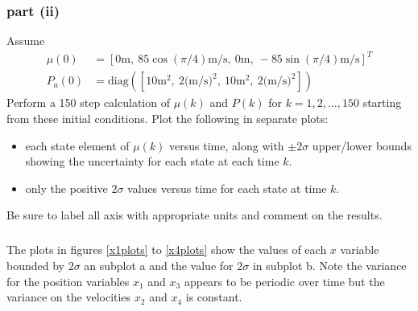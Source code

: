 \documentclass[11pt]{article}
\begin{document}
\subsubsection*{part (ii)}
Assume
\begin{align*}
	\mu(0) &= [0\text{m},\ 85\cos(\pi/4)\text{m/s},\ 0\text{m},\ -85\sin(\pi/4)\text{m/s}]^T \\
	P_a(0) &= \text{diag}([10\text{m}^2,\ 2\text{(m/s)}^2,\ 10\text{m}^2,\ 2\text{(m/s)}^2])
\end{align*}
Perform a 150 step calculation of $\mu(k)$ and $P(k)$ for $k=1,2,\dots,150$ starting from these initial conditions. Plot the following in separate plots:
\begin{itemize}
	\item each state element of $\mu(k)$ versus time, along with $\pm2\sigma$ upper/lower bounds showing the uncertainty for each state at each time $k$.
	\item only the positive $2\sigma$ values versus time for each state at time $k$.
\end{itemize}
Be sure to label all axis with appropriate units and comment on the results.

\subparagraph*{}
The plots in figures \ref{x1plots} to \ref{x4plots} show the values of each $x$ variable bounded by $2\sigma$ an subplot a and the value for $2\sigma$ in subplot b. Note the variance for the position variables $x_1$ and $x_3$ appears to be periodic over time but the variance on the velocities $x_2$ and $x_4$ is constant.
\end{document}
